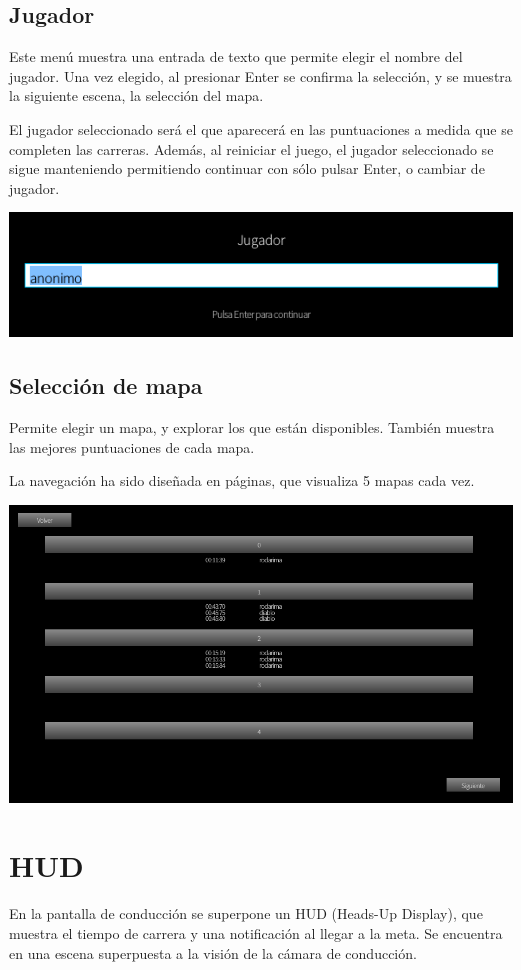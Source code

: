 \documentclass[11pt,a4paper,hidelinks]{article}
\begin{document}
\subsection{Jugador}
Este menú muestra una entrada de texto que permite elegir el nombre del jugador.  
Una vez elegido, al presionar Enter se confirma la selección, y se muestra la 
siguiente escena, la selección del mapa.

El jugador seleccionado será el que aparecerá en las puntuaciones a medida que 
se completen las carreras. Además, al reiniciar el juego, el jugador 
seleccionado se sigue manteniendo permitiendo continuar con sólo pulsar Enter, o 
cambiar de jugador.
\begin{center}
\includegraphics[scale=0.5]{jugador}
\end{center}

\subsection{Selección de mapa}
Permite elegir un mapa, y explorar los que están disponibles. También muestra 
las mejores puntuaciones de cada mapa.

La navegación ha sido diseñada en páginas, que visualiza 5 mapas cada vez.

\includegraphics[width=\textwidth]{browse}


\section{HUD}
En la pantalla de conducción se superpone un HUD (Heads-Up Display), que muestra 
el tiempo de carrera y una notificación al llegar a la meta. Se encuentra en una 
escena superpuesta a la visión de la cámara de conducción.
\end{document}
